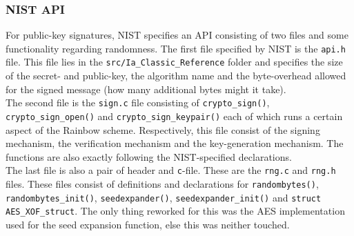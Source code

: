 \subsubsection{NIST API}
For public-key signatures, NIST specifies an API consisting of two files and some functionality regarding randomness. The first file specified by NIST is the \texttt{api.h} file. This file lies in the \texttt{src/Ia\_Classic\_Reference} folder and specifies the size of the secret- and public-key, the algorithm name and the byte-overhead allowed for the signed message (how many additional bytes might it take).
\medskip\\
The second file is the \texttt{sign.c} file consisting of \texttt{crypto\_sign()}, \texttt{crypto\_sign\_open()} and \texttt{crypto\_sign\_keypair()} each of which runs a certain aspect of the Rainbow scheme. Respectively, this file consist of the signing mechanism, the verification mechanism and the key-generation mechanism. The functions are also exactly following the NIST-specified declarations.
\medskip\\
The last file is also a pair of header and \texttt{c}-file. These are the \texttt{rng.c} and \texttt{rng.h} files. These files consist of definitions and declarations for \texttt{randombytes()}, \texttt{randombytes\_init()}, \texttt{seedexpander()}, \texttt{seedexpander\_init()} and \texttt{struct AES\_XOF\_struct}. The only thing reworked for this was the AES implementation used for the seed expansion function, else this was neither touched.
